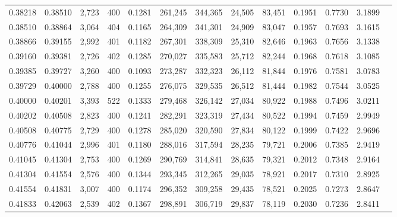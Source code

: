 \begin{tabular}{rrrrrrrrrrrrr}
0.38218 & 0.38510 &  2,723 &   400 &                                     0.1281 & 261,245 & 344,365 &  24,505 &  83,451 & 0.1951 & 0.7730 & 3.1899 \\
0.38510 & 0.38864 &  3,064 &   404 &                                     0.1165 & 264,309 & 341,301 &  24,909 &  83,047 & 0.1957 & 0.7693 & 3.1615 \\
0.38866 & 0.39155 &  2,992 &   401 &                                     0.1182 & 267,301 & 338,309 &  25,310 &  82,646 & 0.1963 & 0.7656 & 3.1338 \\
0.39160 & 0.39381 &  2,726 &   402 &                                     0.1285 & 270,027 & 335,583 &  25,712 &  82,244 & 0.1968 & 0.7618 & 3.1085 \\
0.39385 & 0.39727 &  3,260 &   400 &                                     0.1093 & 273,287 & 332,323 &  26,112 &  81,844 & 0.1976 & 0.7581 & 3.0783 \\
0.39729 & 0.40000 &  2,788 &   400 &                                     0.1255 & 276,075 & 329,535 &  26,512 &  81,444 & 0.1982 & 0.7544 & 3.0525 \\
0.40000 & 0.40201 &  3,393 &   522 &                                     0.1333 & 279,468 & 326,142 &  27,034 &  80,922 & 0.1988 & 0.7496 & 3.0211 \\
0.40202 & 0.40508 &  2,823 &   400 &                                     0.1241 & 282,291 & 323,319 &  27,434 &  80,522 & 0.1994 & 0.7459 & 2.9949 \\
0.40508 & 0.40775 &  2,729 &   400 &                                     0.1278 & 285,020 & 320,590 &  27,834 &  80,122 & 0.1999 & 0.7422 & 2.9696 \\
0.40776 & 0.41044 &  2,996 &   401 &                                     0.1180 & 288,016 & 317,594 &  28,235 &  79,721 & 0.2006 & 0.7385 & 2.9419 \\
0.41045 & 0.41304 &  2,753 &   400 &                                     0.1269 & 290,769 & 314,841 &  28,635 &  79,321 & 0.2012 & 0.7348 & 2.9164 \\
0.41304 & 0.41554 &  2,576 &   400 &                                     0.1344 & 293,345 & 312,265 &  29,035 &  78,921 & 0.2017 & 0.7310 & 2.8925 \\
0.41554 & 0.41831 &  3,007 &   400 &                                     0.1174 & 296,352 & 309,258 &  29,435 &  78,521 & 0.2025 & 0.7273 & 2.8647 \\
0.41833 & 0.42063 &  2,539 &   402 &                                     0.1367 & 298,891 & 306,719 &  29,837 &  78,119 & 0.2030 & 0.7236 & 2.8411 \\

\end{tabular}
